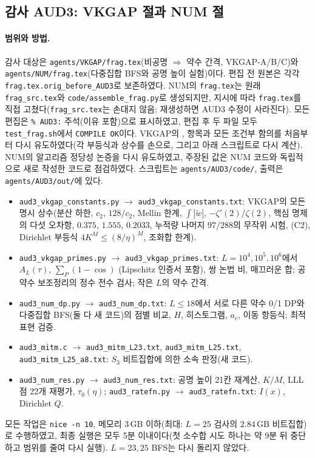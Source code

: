 \subsection{감사 AUD3: VKGAP 절과 NUM 절}\label{AUD3:sec}

\paragraph{범위와 방법.}
감사 대상은 \texttt{agents/VKGAP/frag.tex}(비공명 $\Rightarrow$ 약수 간격, VKGAP-A/B/C)와 \texttt{agents/NUM/frag.tex}(다중집합 BFS와 공명 높이 실험)이다.
편집 전 원본은 각각 \texttt{frag.tex.orig\_before\_AUD3}로 보존하였다. NUM의 \texttt{frag.tex}는 원래 \texttt{frag\_src.tex}와
\texttt{code/assemble\_frag.py}로 생성되지만, 지시에 따라 \texttt{frag.tex}를 직접 고쳤다(\texttt{frag\_src.tex}는 손대지 않음; 재생성하면 AUD3 수정이 사라진다).
모든 편집은 \texttt{\% AUD3:} 주석(이유 포함)으로 표시하였고, 편집 후 두 파일 모두 \texttt{test\_frag.sh}에서 \texttt{COMPILE OK}이다.
VKGAP의 \PROVED, \REFUTED{} 항목과 모든 조건부 함의를 처음부터 다시 유도하였다(각 부등식과 상수를 손으로, 그리고 아래 스크립트로 다시 계산).
NUM의 알고리즘 정당성 논증을 다시 유도하였고, 주장된 값은 NUM 코드와 독립적으로 새로 작성한 코드로 점검하였다.
스크립트는 \texttt{agents/AUD3/code/}, 출력은 \texttt{agents/AUD3/out/}에 있다.
\begin{itemize}[leftmargin=1.5em]
\item \texttt{aud3\_vkgap\_constants.py} $\to$ \texttt{aud3\_vkgap\_constants.txt}: VKGAP의 모든 명시 상수(분산 하한, $c_2$, $128/c_2$, Mellin 한계, $\int|\tilde w|$,
 $-\zeta'(2)/\zeta(2)$, 핵심 명제의 다섯 오차항, $0.375$, $1.555$, $0.2033$, 누적량 나머지 $97/288$의 무작위 시험, (C2), Dirichlet 부등식 $4K^M\le(8/\eta)^M$, 조화합 한계).
\item \texttt{aud3\_vkgap\_primes.py} $\to$ \texttt{aud3\_vkgap\_primes.txt}: $L=10^4,10^5,10^6$에서 $A_L(\tau)$, $\sum_P(1-\cos)$ (Lipschitz 인증서 포함), 쌍 논법 비, 매끄러운 합;
 공약수 보조정리의 정수 전수 검사; 작은 $L$의 약수 간격.
\item \texttt{aud3\_num\_dp.py} $\to$ \texttt{aud3\_num\_dp.txt}: $L\le18$에서 서로 다른 약수 0/1 DP와 다중집합 BFS(둘 다 새 코드)의 점별 비교, $H$, 히스토그램, $a_c$, 이동 항등식; 최적 표현 검증.
\item \texttt{aud3\_mitm.c} $\to$ \texttt{aud3\_mitm\_L23.txt}, \texttt{aud3\_mitm\_L25.txt}, \texttt{aud3\_mitm\_L25\_a8.txt}: $S_3$ 비트집합에 의한 소속 판정(새 코드).
\item \texttt{aud3\_num\_res.py} $\to$ \texttt{aud3\_num\_res.txt}: 공명 높이 21칸 재계산, $K/M$, LLL 점 22개 재평가, $\tau_0(\eta)$; \texttt{aud3\_ratefn.py} $\to$ \texttt{aud3\_ratefn.txt}: $I(x)$, Dirichlet $Q$.
\end{itemize}
모든 작업은 \texttt{nice -n 10}, 메모리 3\,GB 이하(최대: $L=25$ 검사의 $2.84$\,GB 비트집합)로 수행하였고, 최종 실행은 모두 5분 이내이다(첫 소수합 시도 하나는 약 9분 뒤 중단하고 범위를 줄여 다시 실행). $L=23,25$ BFS는 다시 돌리지 않았다.


